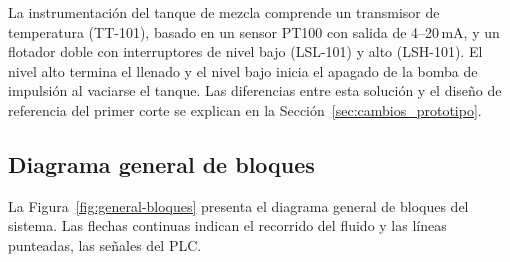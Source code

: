 La instrumentación del tanque de mezcla comprende un transmisor de temperatura (TT-101), basado en un sensor PT100 con salida de 4--20\,mA, y un flotador doble con interruptores de nivel bajo (LSL-101) y alto (LSH-101). El nivel alto termina el llenado y el nivel bajo inicia el apagado de la bomba de impulsión al vaciarse el tanque. Las diferencias entre esta solución y el diseño de referencia del primer corte se explican en la Sección~\ref{sec:cambios_prototipo}.

\subsection{Diagrama general de bloques}

La Figura~\ref{fig:general-bloques} presenta el diagrama general de bloques del sistema. Las flechas continuas indican el recorrido del fluido y las líneas punteadas, las señales del PLC.


